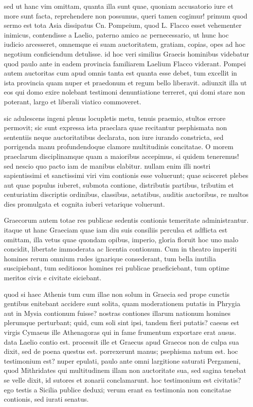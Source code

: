  sed ut hanc vim omittam, quanta illa sunt quae, quoniam accusatorio iure et more sunt facta, reprehendere non possumus, queri tamen cogimur! primum quod sermo est tota Asia dissipatus Cn. Pompeium, quod L. Flacco esset vehementer inimicus, contendisse a Laelio, paterno amico ac pernecessario, ut hunc hoc iudicio arcesseret, omnemque ei suam auctoritatem, gratiam, copias, opes ad hoc negotium conficiendum detulisse. id hoc veri similius Graecis hominibus videbatur quod paulo ante in eadem provincia familiarem Laelium Flacco viderant. Pompei autem auctoritas cum apud omnis tanta est quanta esse debet, tum excellit in ista provincia quam nuper et praedonum et regum bello liberavit. adiunxit illa ut eos qui domo exire nolebant testimoni denuntiatione terreret, qui domi stare non poterant, largo et liberali viatico commoveret.

 sic adulescens ingeni plenus locupletis metu, tenuis praemio, stultos errore permovit; sic sunt expressa ista praeclara quae recitantur psephismata non sententiis neque auctoritatibus declarata, non iure iurando constricta, sed porrigenda manu profundendoque clamore multitudinis concitatae. O morem praeclarum disciplinamque quam a maioribus accepimus, si quidem teneremus! sed nescio quo pacto iam de manibus elabitur. nullam enim illi nostri sapientissimi et sanctissimi viri vim contionis esse voluerunt; quae scisceret plebes aut quae populus iuberet, submota contione, distributis partibus, tributim et centuriatim discriptis ordinibus, classibus, aetatibus, auditis auctoribus, re multos dies promulgata et cognita iuberi vetarique voluerunt.

 Graecorum autem totae res publicae sedentis contionis temeritate administrantur. itaque ut hanc Graeciam quae iam diu suis consiliis perculsa et adflicta est omittam, illa vetus quae quondam opibus, imperio, gloria floruit hoc uno malo concidit, libertate immoderata ac licentia contionum. Cum in theatro imperiti homines rerum omnium rudes ignarique consederant, tum bella inutilia suscipiebant, tum seditiosos homines rei publicae praeficiebant, tum optime meritos civis e civitate eiciebant.

 quod si haec Athenis tum cum illae non solum in Graecia sed prope cunctis gentibus enitebant accidere sunt solita, quam moderationem putatis in Phrygia aut in Mysia contionum fuisse? nostras contiones illarum nationum homines plerumque perturbant; quid, cum soli sint ipsi, tandem fieri putatis? caesus est virgis Cymaeus ille Athenagoras qui in fame frumentum exportare erat ausus. data Laelio contio est. processit ille et Graecus apud Graecos non de culpa sua dixit, sed de poena questus est. porrexerunt manus; psephisma natum est. hoc testimonium est? nuper epulati, paulo ante omni largitione saturati Pergameni, quod Mithridates qui multitudinem illam non auctoritate sua, sed sagina tenebat se velle dixit, id sutores et zonarii conclamarunt. hoc testimonium est civitatis? ego testis a Sicilia publice deduxi; verum erant ea testimonia non concitatae contionis, sed iurati senatus.

